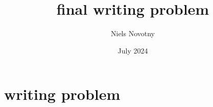\documentclass{article}
\title{final writing problem}
\author{Niels Novotny}
\date{July 2024}
\begin{document}
\maketitle
\section{writing problem}
\end{document}
